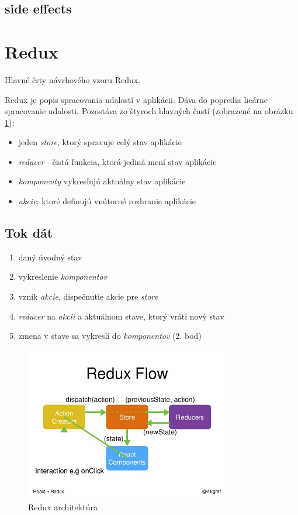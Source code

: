 \subsection{side effects} 
\TODO











\section{Redux}
Hlavné črty návrhového vzoru Redux. 

Redux je popis spracovania udalostí v aplikácii. Dáva do popredia lieárne spracovanie udalosti. Pozostáva zo štyroch hlavných častí (zobrazené na obrázku \ref{obr:redux}):
\begin{itemize}
\item jeden \emph{store}, ktorý spravuje celý stav aplikácie
\item \emph{reducer} - čistá funkcia, ktorá jediná mení stav aplikácie
\item \emph{komponenty} vykresľujú aktuálny stav aplikácie
\item \emph{akcie}, ktoré definujú vnútorné rozhranie aplikácie
\end{itemize}

\subsection{Tok dát}
\begin{enumerate}
\item daný úvodný stav
\item vykreslenie \emph{komponentov}
\item vznik \emph{akcie}, dispečnutie akcie pre \emph{store}
\item \emph{reducer} na \emph{akcii} a aktuálnom stave, ktorý vráti nový stav
\item zmena v stave sa vykreslí do \emph{komponentov} (2. bod)
\end{enumerate}

\begin{figure}
  \centering
    \includegraphics[width=0.8\textwidth]{./images/redux.jpg}
  \caption{Redux architektúra \cite{ReduxObr}}\label{obr:redux}
\end{figure}

